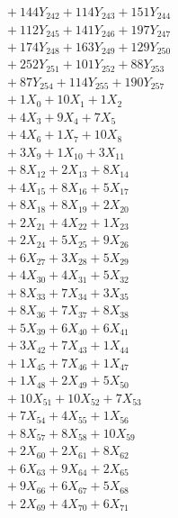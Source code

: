\documentclass[a4paper,10pt]{article}
\begin{document}
{\begin{align}
&\;  + 144 Y_{242} + 114 Y_{243} + 151 Y_{244} \\[0.3ex]
&\;  + 112 Y_{245} + 141 Y_{246} + 197 Y_{247} \\[0.3ex]
&\;  + 174 Y_{248} + 163 Y_{249} + 129 Y_{250} \\[0.3ex]
&\;  + 252 Y_{251} + 101 Y_{252} + 88 Y_{253} \\[0.3ex]
&\;  + 87 Y_{254} + 114 Y_{255} + 190 Y_{257} \\[0.3ex]
&\;  + 1 X_{0} + 10 X_{1} + 1 X_{2} \\[0.3ex]
&\;  + 4 X_{3} + 9 X_{4} + 7 X_{5} \\[0.3ex]
&\;  + 4 X_{6} + 1 X_{7} + 10 X_{8} \\[0.3ex]
&\;  + 3 X_{9} + 1 X_{10} + 3 X_{11} \\[0.5ex]\allowbreak
&\;  + 8 X_{12} + 2 X_{13} + 8 X_{14} \\[0.3ex]
&\;  + 4 X_{15} + 8 X_{16} + 5 X_{17} \\[0.3ex]
&\;  + 8 X_{18} + 8 X_{19} + 2 X_{20} \\[0.3ex]
&\;  + 2 X_{21} + 4 X_{22} + 1 X_{23} \\[0.3ex]
&\;  + 2 X_{24} + 5 X_{25} + 9 X_{26} \\[0.3ex]
&\;  + 6 X_{27} + 3 X_{28} + 5 X_{29} \\[0.3ex]
&\;  + 4 X_{30} + 4 X_{31} + 5 X_{32} \\[0.3ex]
&\;  + 8 X_{33} + 7 X_{34} + 3 X_{35} \\[0.3ex]
&\;  + 8 X_{36} + 7 X_{37} + 8 X_{38} \\[0.3ex]
&\;  + 5 X_{39} + 6 X_{40} + 6 X_{41} \\[0.5ex]\allowbreak
&\;  + 3 X_{42} + 7 X_{43} + 1 X_{44} \\[0.3ex]
&\;  + 1 X_{45} + 7 X_{46} + 1 X_{47} \\[0.3ex]
&\;  + 1 X_{48} + 2 X_{49} + 5 X_{50} \\[0.3ex]
&\;  + 10 X_{51} + 10 X_{52} + 7 X_{53} \\[0.3ex]
&\;  + 7 X_{54} + 4 X_{55} + 1 X_{56} \\[0.3ex]
&\;  + 8 X_{57} + 8 X_{58} + 10 X_{59} \\[0.3ex]
&\;  + 2 X_{60} + 2 X_{61} + 8 X_{62} \\[0.3ex]
&\;  + 6 X_{63} + 9 X_{64} + 2 X_{65} \\[0.3ex]
&\;  + 9 X_{66} + 6 X_{67} + 5 X_{68} \\[0.3ex]
&\;  + 2 X_{69} + 4 X_{70} + 6 X_{71} \\[0.5ex]\allowbreak

\end{align}}
\end{document}
